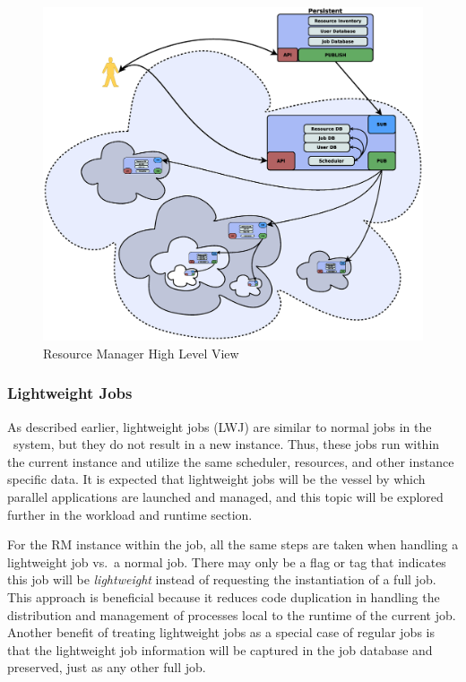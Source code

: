 \begin{figure}
\centering
\includegraphics[scale=0.20]{../fig/RM-full.eps}
\caption{Resource Manager High Level View}
\label{fig:RMComponents}
\end{figure}


\subsubsection{Lightweight Jobs}

As described earlier, lightweight jobs (LWJ) are similar to normal
jobs in the \ngrm\ system, but they do not result in a new
instance. Thus, these jobs run within the current instance and
utilize the same scheduler, resources, and other instance specific
data. It is expected that lightweight jobs will be the vessel by
which parallel applications are launched and managed, and this
topic will be explored further in the workload and runtime section.

For the RM instance within the job, all the same steps are taken
when handling a lightweight job vs.\ a normal job.  There may only
be a flag or tag that indicates this job will be \emph{lightweight}
instead of requesting the instantiation of a full job. This approach
is beneficial because it reduces code duplication in handling the
distribution and management of processes local to the runtime of
the current job. Another benefit of treating lightweight jobs
as a special case of regular jobs is that the lightweight job
information will be captured in the job database and preserved,
just as any other full job.

